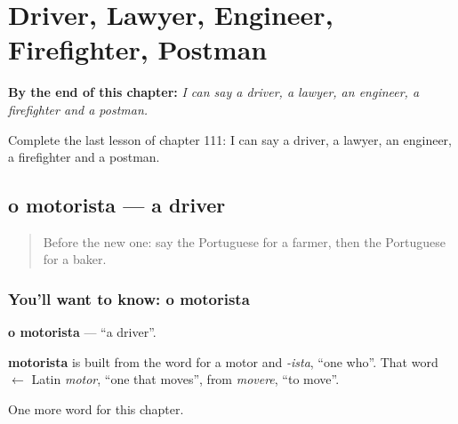 
\chapter{Driver, Lawyer, Engineer, Firefighter, Postman}
\label{ch:pt-driver-lawyer-engineer-firefighter-postman}

\begin{chapteropening}
\textbf{By the end of this chapter:} \emph{I can say a driver, a lawyer, an engineer, a firefighter and a postman.}

Complete the last lesson of chapter 111: I can say a driver, a lawyer, an engineer, a firefighter and a postman.
\end{chapteropening}

\section[o motorista]{o motorista — a driver}

\label{lesson:PT-C111-motorista}



\begin{quote}
Before the new one: say the Portuguese for a farmer, then the Portuguese for a baker.
\end{quote}

\subsection*{You'll want to know: o motorista}
\textbf{o motorista} — \textquotedblleft{}a driver\textquotedblright{}.

\begin{cousinweb}
\textbf{motorista} is built from the word for a motor and \emph{-ista}, \textquotedblleft{}one who\textquotedblright{}. That word $\leftarrow$ Latin \emph{motor}, \textquotedblleft{}one that moves\textquotedblright{}, from \emph{movere}, \textquotedblleft{}to move\textquotedblright{}.
\end{cousinweb}

\begin{grammarlens}[title={What you've built}]
One more word for this chapter.
\end{grammarlens}

